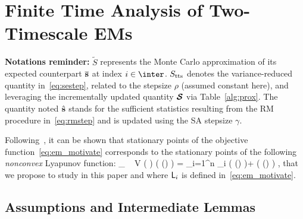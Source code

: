 \documentclass[12pt]{article}
\begin{document}



\section{Finite Time Analysis of Two-Timescale EMs} \label{sec:mainanalysis}
\textbf{Notations reminder:}
$\tilde{S}$ represents the Monte Carlo approximation of its expected counterpart $\overline{{\mathbf{s}}}$ at index $i \in \inter$.
$S_{\textrm{tts}}$ denotes the variance-reduced quantity in~\eqref{eq:sestep}, related to the stepsize $\rho$ (assumed constant here), and leveraging the incrementally updated quantity ${\bm{\mathcal{S}}}$ via Table~\ref{alg:prox}.
The quantity noted $\hat{{\mathbf{s}}}$ stands for the sufficient statistics resulting from the RM procedure in~\eqref{eq:rmstep} and is updated using the SA stepsize $\gamma$.

Following~\citet{cappe2009line}, it can be shown that stationary points of the objective function~\eqref{eq:em_motivate} corresponds to the stationary points of the following \textit{nonconvex} Lyapunov function:
\beq\label{eq:em_sspace}
\min_{ {\bss} \in \Sset }~  V ( {\bss} ) \eqdef \overline\calL( \op(\bss) ) =   \sum_{i=1}^n  \calL _i (  \op(\bss) )+ \Pen (  \op(\bss) ) \eqs,
\eeq
that we propose to study in this paper and where ${\textsf{L}} _i$ is defined in~\eqref{eq:em_motivate}.


\subsection{Assumptions and Intermediate Lemmas}
\end{document}
